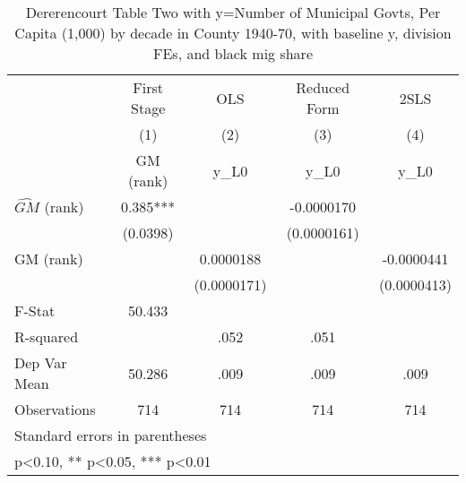 \begin{table}[htbp]\centering
\def\sym#1{\ifmmode^{#1}\else\(^{#1}\)\fi}
\caption{Dererencourt Table Two with y=Number of Municipal Govts, Per Capita (1,000) by decade in County 1940-70, with baseline y, division FEs, and black mig share}
\begin{tabular}{l*{4}{c}}
\toprule
                    & First Stage   &         OLS   &Reduced Form   &        2SLS   \\
                    &\multicolumn{1}{c}{(1)}&\multicolumn{1}{c}{(2)}&\multicolumn{1}{c}{(3)}&\multicolumn{1}{c}{(4)}\\
                    &\multicolumn{1}{c}{GM  (rank)}&\multicolumn{1}{c}{y\_L0}&\multicolumn{1}{c}{y\_L0}&\multicolumn{1}{c}{y\_L0}\\
\midrule
$\hat{GM}$ (rank)   &       0.385***&               &  -0.0000170   &               \\
                    &    (0.0398)   &               & (0.0000161)   &               \\
\addlinespace
GM  (rank)          &               &   0.0000188   &               &  -0.0000441   \\
                    &               & (0.0000171)   &               & (0.0000413)   \\
\midrule
F-Stat              &      50.433   &               &               &               \\
R-squared           &               &        .052   &        .051   &               \\
Dep Var Mean        &      50.286   &        .009   &        .009   &        .009   \\
Observations        &         714   &         714   &         714   &         714   \\
\bottomrule
\multicolumn{5}{l}{\footnotesize Standard errors in parentheses}\\
\multicolumn{5}{l}{\footnotesize * p<0.10, ** p<0.05, *** p<0.01}\\
\end{tabular}
\end{table}
